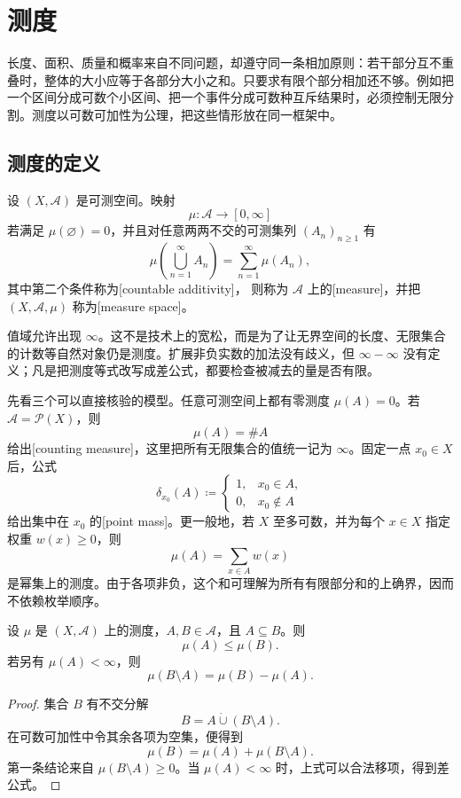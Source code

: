 \section{测度}
\label{b1:sec:0201}

长度、面积、质量和概率来自不同问题，却遵守同一条相加原则：若干部分互不重叠时，整体的大小应等于各部分大小之和。只要求有限个部分相加还不够。例如把一个区间分成可数个小区间、把一个事件分成可数种互斥结果时，必须控制无限分割。测度以可数可加性为公理，把这些情形放在同一框架中。

\subsection{测度的定义}
\label{b1:subsec:020101}

\begin{definition}
\label{b1:def:measure}
设 \((X,\mathcal A)\) 是可测空间。映射
\[
\mu:\mathcal A\longrightarrow[0,\infty]
\]
若满足 \(\mu(\varnothing)=0\)，并且对任意两两不交的可测集列 \((A_n)_{n\geq1}\) 有
\[
\mu\left(\bigcup_{n=1}^{\infty}A_n\right)
=\sum_{n=1}^{\infty}\mu(A_n),
\]
其中第二个条件称为[countable additivity]，
则称为 \(\mathcal A\) 上的[measure]，并把 \((X,\mathcal A,\mu)\) 称为[measure space]。
\end{definition}

值域允许出现 \(\infty\)。这不是技术上的宽松，而是为了让无界空间的长度、无限集合的计数等自然对象仍是测度。扩展非负实数的加法没有歧义，但 \(\infty-\infty\) 没有定义；凡是把测度等式改写成差公式，都要检查被减去的量是否有限。

\ProseParagraphBreak

先看三个可以直接核验的模型。任意可测空间上都有零测度 \(\mu(A)=0\)。若 \(\mathcal A=\mathcal P(X)\)，则
\[
\mu(A)=\#A
\]
给出[counting measure]，这里把所有无限集合的值统一记为 \(\infty\)。固定一点 \(x_0\in X\) 后，公式
\[
\delta_{x_0}(A)\coloneqq
\begin{cases}
1,&x_0\in A,\\
0,&x_0\notin A
\end{cases}
\]
给出集中在 \(x_0\) 的[point mass]。更一般地，若 \(X\) 至多可数，并为每个 \(x\in X\) 指定权重 \(w(x)\geq0\)，则
\[
\mu(A)=\sum_{x\in A}w(x)
\]
是幂集上的测度。由于各项非负，这个和可理解为所有有限部分和的上确界，因而不依赖枚举顺序。

\begin{proposition}
\label{b1:prop:measure-monotonicity}
设 \(\mu\) 是 \((X,\mathcal A)\) 上的测度，\(A,B\in\mathcal A\)，且 \(A\subseteq B\)。则
\[
\mu(A)\leq\mu(B).
\]
若另有 \(\mu(A)<\infty\)，则
\[
\mu(B\setminus A)=\mu(B)-\mu(A).
\]
\end{proposition}
\begin{proof}
集合 \(B\) 有不交分解
\[
B=A\mathbin{\dot\cup}(B\setminus A).
\]
在可数可加性中令其余各项为空集，便得到
\[
\mu(B)=\mu(A)+\mu(B\setminus A).
\]
第一条结论来自 \(\mu(B\setminus A)\geq0\)。当 \(\mu(A)<\infty\) 时，上式可以合法移项，得到差公式。
\end{proof}


